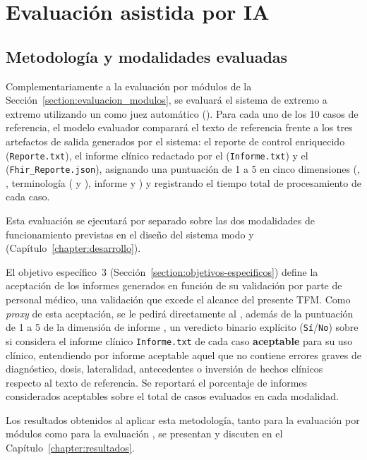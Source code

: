 \section{Evaluación  asistida por IA}\label{section:evaluacion_e2e}

\subsection{Metodología y modalidades evaluadas}\label{subsection:metodologia_e2e}

Complementariamente a la evaluación por módulos de la Sección~\ref{section:evaluacion_modulos}, se
evaluará el sistema de extremo a extremo utilizando un  como juez automático
(). Para cada uno de los 10 casos de referencia, el modelo evaluador comparará
el texto de referencia frente a los tres artefactos de salida generados
por el sistema: el reporte de control enriquecido (\texttt{Reporte.txt}), el informe clínico
redactado por el  (\texttt{Informe.txt}) y el 
(\texttt{Fhir\_Reporte.json}), asignando una puntuación de 1 a 5 en cinco dimensiones
(, , terminología ( y ),
informe  y ) y registrando el tiempo total de procesamiento de
cada caso.

Esta evaluación se ejecutará por separado sobre las dos modalidades de funcionamiento previstas en el
diseño del sistema modo  y  (Capítulo~\ref{chapter:desarrollo}).

El objetivo específico~3 (Sección~\ref{section:objetivos-especificos}) define la aceptación de los
informes generados en función de su validación por parte de personal médico, una validación que
excede el alcance del presente TFM. Como \textit{proxy} de esta aceptación, se le pedirá
directamente al , además de la puntuación de 1 a 5 de la dimensión de
informe , un veredicto binario explícito (\texttt{Sí}/\texttt{No}) sobre si
considera el informe clínico \texttt{Informe.txt} de cada caso \textbf{aceptable} para su uso
clínico, entendiendo por informe aceptable aquel que no contiene errores graves de diagnóstico,
dosis, lateralidad, antecedentes o inversión de hechos clínicos respecto al texto de referencia. Se
reportará el porcentaje de informes considerados aceptables sobre el total de casos evaluados en
cada modalidad.

Los resultados obtenidos al aplicar esta metodología, tanto para la evaluación por módulos como para
la evaluación , se presentan y discuten en el Capítulo~\ref{chapter:resultados}.
